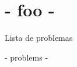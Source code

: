\documentclass{article}
\begin{document}
\section{ {{- foo -}} }

Lista de problemas

{{- problems -}}
\end{document}
